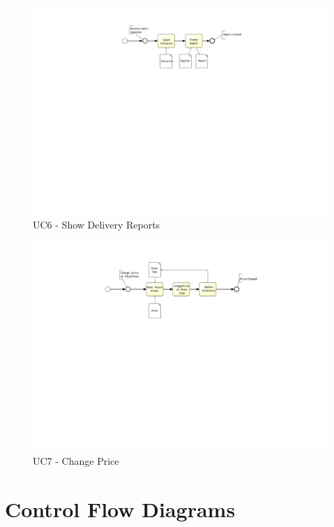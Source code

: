 \begin{figure}[h!]
	\centering
	\includegraphics[width=\textwidth, trim={6cm 14.5cm 7cm 1cm}]{img/UC6.pdf}
	\caption{UC6 - Show Delivery Reports }
	\label{fig:UC6}
\end{figure}

\begin{figure}[h!]
	\centering
	\includegraphics[width=\textwidth, trim={6cm 13cm 7cm 1cm}]{img/UC7.pdf}
	\caption{UC7 - Change Price }
	\label{fig:UC7}
\end{figure}

\clearpage

\section{Control Flow Diagrams}
\label{sec:appendix:ControlFlow}

